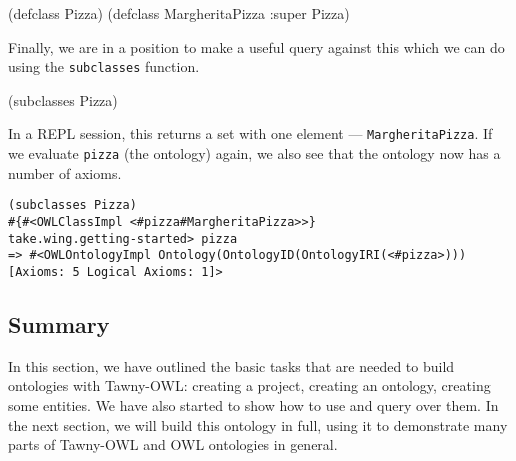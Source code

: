 \begin{tawny}
(defclass Pizza)
(defclass MargheritaPizza :super Pizza)
\end{tawny}

Finally, we are in a position to make a useful query against this which
we can do using the \texttt{subclasses} function.

\begin{tawny}
(subclasses Pizza)
\end{tawny}

In a REPL session, this returns a set with one element ---
\texttt{MargheritaPizza}. If we evaluate \texttt{pizza} (the ontology) again, we also
see that the ontology now has a number of axioms.


\begin{verbatim}
(subclasses Pizza)
#{#<OWLClassImpl <#pizza#MargheritaPizza>>}
take.wing.getting-started> pizza
=> #<OWLOntologyImpl Ontology(OntologyID(OntologyIRI(<#pizza>))) [Axioms: 5 Logical Axioms: 1]>
\end{verbatim}


\subsection{Summary}
\label{sec-4-5}

In this section, we have outlined the basic tasks that are needed to
build ontologies with Tawny-OWL: creating a project, creating an
ontology, creating some entities. We have also started to show how to
use and query over them. In the next section, we will build this
ontology in full, using it to demonstrate many parts of Tawny-OWL and
OWL ontologies in general.


